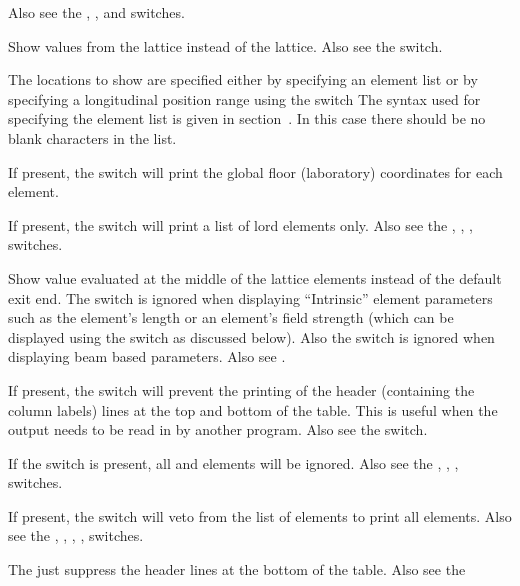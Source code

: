 {{{{{{{{\begin{description}
Also see the , , and  switches.
%
\item[-design] \Newline
  Show values from the  lattice instead of the  lattice. Also see the  switch.
%
\item[<element_list>] \Newline
The locations to show are specified either by specifying an element list or by specifying a
longitudinal position range using the  switch The syntax used for specifying the element list
is given in section~.  In this case there should be no blank characters in
the list.
%
\item[-floor_coords] \Newline
If present, the  switch will print the global floor (laboratory) coordinates for
each element.
%
\item[-lords] \Newline
If present, the  switch will print a list of lord elements only. Also see the
, , ,  switches.
%
\item[-middle] \Newline
Show value evaluated at the middle of the lattice elements instead of the default exit end.
The  switch is ignored when displaying ``Intrinsic'' element
parameters such as the element's length or an element's field strength (which can be displayed using
the  switch as discussed below). Also the  switch is ignored when
displaying beam based parameters. Also see .
%
\item[-no_label_lines] \Newline
If present, the  switch will prevent the printing of the header (containing the
column labels) lines at the top and bottom of the table.  This is useful when the output needs to be
read in by another program. Also see the  switch.
%
\item[-no_slaves] \Newline
If the  switch is present, all  and  elements
will be ignored. Also see the , , , 
switches.
%
\item[-no_super_slaves] \Newline
If present, the  switch will veto from the list of elements to print all
 elements. Also see the , , , ,
 switches.
%
\item[-no_tail_lines] \Newline
The  just suppress the header lines at the bottom of the table. Also see the

\end{description}}}}}}}}}
